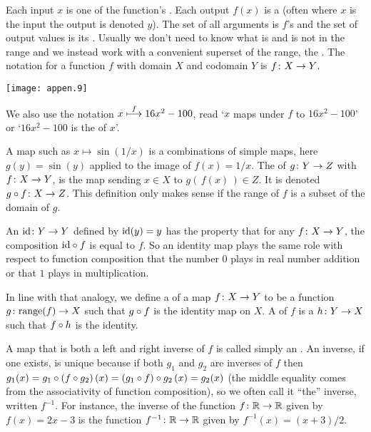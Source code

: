 Each input \( x \) is one of the function's 
. 
Each output \( f(x) \) is a 
(often where $x$ is the input the output is denoted $y$).
The set of all arguments is \( f \)'s 
and the set of output values is its 
.
Usually we don't need to know what is and is not in the range and we instead
work with a convenient superset of the range, the
.
The notation for a function \( f \) with domain \( X \) and codomain \( Y \) is
\( \mbox{$f\colon X\to Y$} \).
\begin{center}
  \texttt{[image: appen.9]}
\end{center}
We also use the notation \( x\stackrel{f}{\longmapsto} 16x^2-100 \), read
`\( x \) maps under \( f \) to \( 16x^2-100 \)' or
`\( 16x^2-100 \) is the  
of \( x \)'.

A map such as \( x\mapsto \sin(1/x) \) is a
combinations of simple maps, here
\( g(y)=\sin(y) \) applied to the image of \( f(x)=1/x \).
The  
of \( \mbox{$g\colon Y\to Z$} \) with \( \mbox{$f\colon X\to Y$} \),
is the map sending
\( x\in X \) to \( g(\, f(x)\,)\in Z \).
It is denoted \( \mbox{$g\mathbin\circ f\colon X\to Z$} \).
This definition only makes sense if the range of \( f \) is a
subset of the domain of \( g \).

An 
\( \mbox{$\mbox{id}\colon Y\to Y$} \) defined by
\( \mbox{id}(y)=y \) has the property that for any \( \mbox{$f\colon X\to Y$} \),
the composition \( \mbox{id}\mathbin\circ f \) is equal to \( f \).
So an identity map plays the same role with respect to function composition
that the number \( 0 \) plays in real number addition or that 
\( 1 \) plays in multiplication.

In line with that analogy, we define a
 of a map 
\( \mbox{$f\colon X\to Y$} \) to be a
function \( \mbox{$g\colon \text{range}(f)\to X$} \) such that \( g\mathbin\circ f \)
is the identity map on \( X \).
A  of \( f \) is a
\( \mbox{$h\colon Y\to X$} \) such that \( f\mathbin\circ h \) is the identity.

A map that is both a left and right inverse of \( f \)
is called simply an 
.
An inverse, if one exists, is unique because if both \( g_1 \) and
\( g_2 \) are inverses of \( f \) then
\( g_1(x)=g_1\mathbin\circ  (f\mathbin\circ g_2)\,(x)
         =(g_1\mathbin\circ f) \mathbin\circ g_2\,(x)
         =g_2(x) \)
(the middle equality comes from the associativity of function composition),
so we often call it ``the'' inverse, written \( f^{-1} \).
For instance, the inverse of the function \( \mbox{$f\colon \mathbb{R}\to \mathbb{R}$} \)
given by \( f(x)=2x-3 \) is the function \( \mbox{$f^{-1}\colon \mathbb{R}\to \mathbb{R}$} \)
given by \( f^{-1}(x)=(x+3)/2 \).

